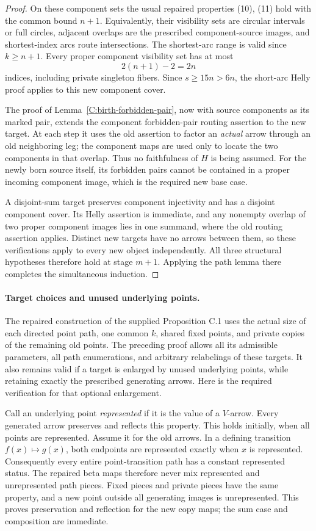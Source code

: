 \begin{proof}
On these component sets the usual repaired properties (10), (11)
hold with the common bound $n+1$. Equivalently, their visibility
sets are circular intervals or full circles, adjacent overlaps
are the prescribed component-source images, and shortest-index
arcs route intersections. The shortest-arc range is valid since
$k\geq n+1$. Every proper component visibility set has at most
\[
                              2(n+1)-2=2n
\]
indices, including private singleton fibers. Since $s\geq15n>6n$,
the short-arc Helly proof applies to this new component cover.

The proof of Lemma~\ref{C:birth-forbidden-pair}, now with source
components as its marked pair, extends the component forbidden-pair
routing assertion to the new target. At each step it uses the
old assertion to factor an \emph{actual} arrow through an old
neighboring leg; the component maps are used only to locate the
two components in that overlap. Thus no faithfulness of $H$ is
being assumed. For the newly born source itself, its forbidden
pairs cannot be contained in a proper incoming component image,
which is the required new base case.

A disjoint-sum target preserves component injectivity and has
a disjoint component cover. Its Helly assertion is immediate,
and any nonempty overlap of two proper component images lies in
one summand, where the old routing assertion applies. Distinct
new targets have no arrows between them, so these verifications
apply to every new object independently. All three structural
hypotheses therefore hold at stage $m+1$. Applying the path
lemma there completes the simultaneous induction.
\end{proof}

\paragraph{Target choices and unused underlying points.}
The repaired construction of the supplied Proposition C.1 uses
the actual size of each directed point path, one common $k$,
shared fixed points, and private copies of the remaining old
points. The preceding proof allows all its admissible parameters,
all path enumerations, and arbitrary relabelings of these targets.
It also remains valid if a target is enlarged by unused underlying
points, while retaining exactly the prescribed generating arrows.
Here is the required verification for that optional enlargement.

Call an underlying point \emph{represented} if it is the value of
a $V$-arrow. Every generated arrow preserves and reflects this
property. This holds initially, when all points are represented.
Assume it for the old arrows. In a defining transition
$f(x)\mapsto g(x)$, both endpoints are represented exactly when
$x$ is represented. Consequently every entire point-transition
path has a constant represented status. The repaired beta maps
therefore never mix represented and unrepresented path pieces.
Fixed pieces and private pieces have the same property, and a
new point outside all generating images is unrepresented.
This proves preservation and reflection for the new copy maps;
the sum case and composition are immediate.

